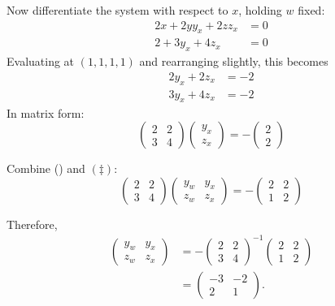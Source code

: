 \documentclass{exam}
\begin{document}
\begin{questions}
\begin{solution}
        Now differentiate the system with respect to $x$, holding $w$ fixed:
        \begin{align*}
            2x + 2yy_x + 2zz_x &= 0\\
            2 + 3y_x + 4z_x &= 0
        \end{align*}
        Evaluating at $(1,1,1,1)$ and rearranging slightly, this becomes
        \begin{align*}
            2y_x + 2z_x &= -2\\
            3y_x + 4z_x &= -2
        \end{align*}
        In matrix form:
        \[
            \begin{pmatrix}
                2&2\\3&4
            \end{pmatrix}\begin{pmatrix}
                y_x\\z_x
            \end{pmatrix}= -\begin{pmatrix}
                2\\2
            \end{pmatrix}\tag{\ddag}
        \]

        Combine (\dag) and $(\ddag)$:
        \[
            \begin{pmatrix}
                2&2\\3&4
            \end{pmatrix}\begin{pmatrix}
                y_w&y_x\\z_w&z_x
            \end{pmatrix}= -\begin{pmatrix}
                2&2\\1&2
            \end{pmatrix}
        \]

        Therefore,
        \begin{align*}
            \begin{pmatrix}
                y_w&y_x\\z_w&z_x
            \end{pmatrix}&=- \begin{pmatrix}
                2&2\\3&4
            \end{pmatrix}^{-1}\begin{pmatrix}
                2&2\\1&2
            \end{pmatrix}\\
            &= \begin{pmatrix}
                -3&-2\\2&1
            \end{pmatrix}.
        \end{align*}
    \end{solution}


\end{questions}
\end{document}
